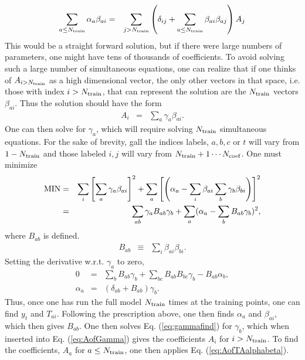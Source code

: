 \documentclass[UserManual.tex]{subfiles}
\begin{document}
\begin{eqnarray}
\sum_{a\le N_{\rm train}}\alpha_a\beta_{ai}&=&\sum_{j>N_{\rm train}} \left(\delta_{ij}+\sum_{a\le N_{\rm train}}\beta_{ai}\beta_{aj}\right)A_j
\end{eqnarray}
This would be a straight forward solution, but if there were large numbers of parameters, one might have tens of thousands of coefficients. To avoid solving such a large number of simultaneous equations, one can realize that if one thinks of $A_{i>N_{\rm train}}$ as a high dimensional vector, the only other vectors in that space, i.e. those with index $i>N_{\rm train}$, that can represent the solution are the $N_{\rm train}$ vectors $\beta_{ai}$. Thus the solution should have the form
\begin{eqnarray}
\label{eq:AofGamma}
A_{i}&=&\sum_a\gamma_a \beta_{ai}.
\end{eqnarray}
One can then solve for $\gamma_a$, which will require solving $N_{\rm train}$ simultaneous equations. For the sake of brevity, gall the indices labels, $a,b,c$ or $t$ will vary from $1-N_{\rm train}$ and those labeled $i,j$ will vary from $N_{\rm train}+1\cdots N_{\rm coef}$. One must minimize
\begin{eqnarray}
{\rm MIN}&=&\sum_i \left[\sum_a \gamma_a\beta_{ai}\right]^2
+\sum_a\left[\left(\alpha_a-\sum_i\beta_{ai}\sum_b\gamma_b\beta_{bi}\right)\right]^2\\
\nonumber
&=&\sum_{ab}\gamma_aB_{ab}\gamma_b+\sum_a(\alpha_a-\sum_bB_{ab}\gamma_b)^2,
\end{eqnarray}
where $B_{ab}$ is defined.
\begin{eqnarray}
B_{ab}&\equiv&\sum_i\beta_{ai}\beta_{bi}.
\end{eqnarray}
Setting the derivative w.r.t. $\gamma_a$ to zero,
\begin{eqnarray}\label{eq:gammafind}
0&=&\sum_bB_{ab}\gamma_b+\sum_{bc}B_{ab}B_{bc}\gamma_b-B_{ab}\alpha_b,\\
\nonumber
\alpha_a&=&\left(\delta_{ab}+B_{ab}\right)\gamma_b.
\end{eqnarray}
Thus, once one has run the full model $N_{\rm train}$ times at the training points, one can find $y_t$ and $T_{ai}$. Following the prescription above, one then finds $\alpha_a$ and $\beta_{ai}$, which then gives $B_{ab}$. One then solves Eq. (\ref{eq:gammafind}) for $\gamma_b$, which when inserted into Eq. (\ref{eq:AofGamma}) gives the coefficients $A_i$ for $i>N_{\rm train}$. To find the coefficients, $A_a$ for $a\le N_{\rm train}$, one then applies Eq. (\ref{eq:AofTAalphabeta}).
\end{document}
